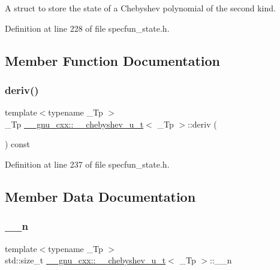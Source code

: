 A struct to store the state of a Chebyshev polynomial of the second kind. 

Definition at line 228 of file specfun\+\_\+state.\+h.



\subsection{Member Function Documentation}
\mbox{\label{struct____gnu__cxx_1_1____chebyshev__u__t_ad850788d0ce4eb967c52692f599073cd}} 
\subsubsection{\texorpdfstring{deriv()}{deriv()}}
{\footnotesize\ttfamily template$<$typename \+\_\+\+Tp $>$ \\
\+\_\+\+Tp \hyperlink{struct____gnu__cxx_1_1____chebyshev__u__t}{\+\_\+\+\_\+gnu\+\_\+cxx\+::\+\_\+\+\_\+chebyshev\+\_\+u\+\_\+t}$<$ \+\_\+\+Tp $>$\+::deriv (\begin{DoxyParamCaption}{ }\end{DoxyParamCaption}) const\hspace{0.3cm}{\ttfamily [inline]}}



Definition at line 237 of file specfun\+\_\+state.\+h.



\subsection{Member Data Documentation}
\mbox{\label{struct____gnu__cxx_1_1____chebyshev__u__t_af53b3900d2fe12c86d6d436feda54d4e}} 
\subsubsection{\texorpdfstring{\+\_\+\+\_\+n}{\_\_n}}
{\footnotesize\ttfamily template$<$typename \+\_\+\+Tp $>$ \\
std\+::size\+\_\+t \hyperlink{struct____gnu__cxx_1_1____chebyshev__u__t}{\+\_\+\+\_\+gnu\+\_\+cxx\+::\+\_\+\+\_\+chebyshev\+\_\+u\+\_\+t}$<$ \+\_\+\+Tp $>$\+::\+\_\+\+\_\+n}



